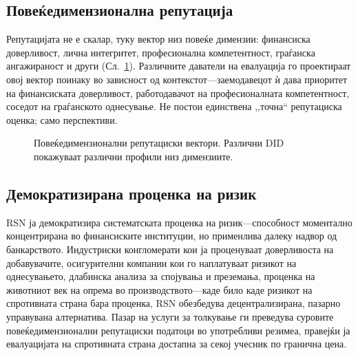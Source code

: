 \documentclass[11pt,a4paper,twocolumn]{article}
\begin{document}
\subsection{Повеќедимензионална репутација}

Репутацијата не е скалар, туку вектор низ повеќе димензии: финансиска доверливост, лична интегритет, професионална компетентност, граѓанска ангажираност и други (Сл.~\ref{fig:reputation-radar}). Различните даватели на евалуација го проектираат овој вектор поинаку во зависност од контекстот---заемодавецот ѝ дава приоритет на финансиската доверливост, работодавачот на професионалната компетентност, соседот на граѓанското однесување. Не постои единствена ,,точна`` репутациска оценка; само перспективи.

\begin{figure}[ht]
\centering
{}
\caption{Повеќедимензионални репутациски вектори. Различни DID покажуваат различни профили низ димензиите.}
\label{fig:reputation-radar}
\end{figure}

\subsection{Демократизирана проценка на ризик}

RSN ја демократизира систематската проценка на ризик---способност моментално концентрирана во финансиските институции, но применлива далеку надвор од банкарството. Индустриски конгломерати кои ја проценуваат доверливоста на добавувачите, осигурителни компании кои го наплатуваат ризикот на однесувањето, длабинска анализа за спојувања и преземања, проценка на животниот век на опрема во производството---каде било каде ризикот на спротивната страна бара проценка, RSN обезбедува децентрализирана, пазарно управувана алтернатива. Пазар на услуги за толкување ги преведува суровите повеќедимензионални репутациски податоци во употребливи резимеа, правејќи ја евалуацијата на спротивната страна достапна за секој учесник по гранична цена.
\end{document}
